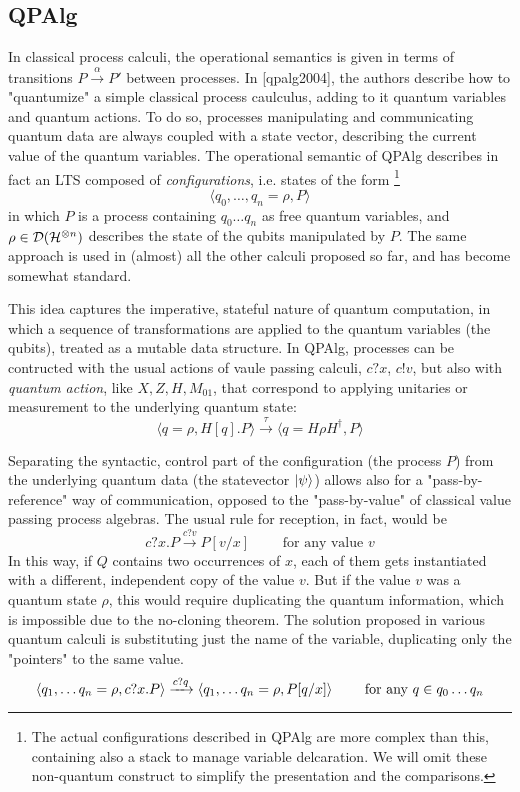 \subsection{QPAlg}

In classical process calculi, the operational semantics is given in terms of transitions $P \xrightarrow{\alpha} P'$ between processes. In [qpalg2004], the authors describe how to "quantumize" a simple classical process caulculus, adding to it quantum variables and quantum actions. To do so, processes manipulating and communicating quantum data are always coupled with a state vector, describing the current value of the quantum variables. The operational semantic of QPAlg describes in fact an LTS composed of \textit{configurations}, i.e. states of the form \footnote{The actual configurations described in QPAlg are more complex than this, containing also a stack to manage variable delcaration. We will omit these non-quantum construct to simplify the presentation and the comparisons.}
\[
	\langle q_0, \ldots, q_n = \rho, P\rangle
\] 
in which $P$ is a process containing $q_0 \ldots q_n$ as free quantum variables, and $\rho \in \mathcal{D}(\mathcal{H}^{\otimes n})$  describes the state of the qubits manipulated by $P$. The same approach is used in (almost) all the other calculi proposed so far, and has become somewhat standard.

This idea captures the imperative, stateful nature of quantum computation, in which a sequence of transformations are applied to the quantum variables (the qubits), treated as a mutable data structure.
In QPAlg, processes can be contructed with the usual actions of vaule passing calculi, $c?x$, $c!v$, but also with \textit{quantum action}, like $X, Z, H, M_{01}$, that correspond to applying unitaries or measurement to the underlying quantum state: \[ \langle q = \rho, H[q].P \rangle \xrightarrow{\tau} \langle q = H\rho H^\dagger, P \rangle\]

Separating the syntactic, control part of the configuration (the process $P$) from the underlying quantum data (the statevector $\ket{\psi}$) allows also for a "pass-by-reference" way of communication, opposed to the "pass-by-value" of classical value passing process algebras.
The usual rule for reception, in fact, would be
\[ c?x.P \xrightarrow{c?v} P[v/x]  \qquad \text{ for any value } v
\]
In this way, if $Q$ contains two occurrences of $x$, each of them gets instantiated with a different, independent copy of the value $v$. But if the value $v$ was a quantum state $\rho$, this would require duplicating the quantum information, which is impossible due to the no-cloning theorem. The solution proposed in various quantum calculi is substituting just the name of the variable, duplicating only the "pointers" to the same value.
\[ \langle q_1, \ldots q_n = \rho, c?x.P \rangle \xrightarrow{c?q} \langle q_1, \ldots q_n = \rho, P[q/x]\rangle \qquad \text{ for any } q \in q_0 \ldots q_n
\]

